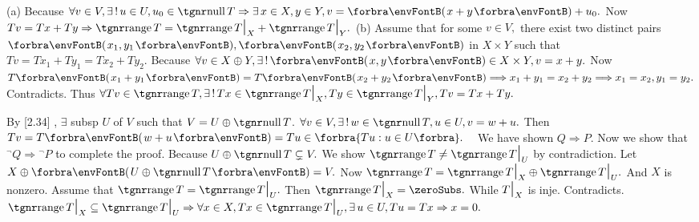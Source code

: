 (a) Because $\forall v\in V,\exists\,!\,u\in U,u_0\in\null T\Rightarrow\exists\,x\in X,y\in Y,v=\Par{x+y}+u_0.$\parSol{\Ha}
Now $Tv=Tx+Ty\Rightarrow\range T=\range T\mmid_X+\range T\mmid_Y.$\parSol{\vspace{2pt}}
(b) Assume that for some $v\in V,$ there exist two distinct pairs $\Par{x_1,y_1},\Par{x_2,y_2}$ in $X\times Y$\parSol{\Hb}
such that $Tv=Tx_1+Ty_1=Tx_2+Ty_2.$ Because $\forall v\in X\oplus Y,\exists\,!\,\Par{x,y}\in X\times Y,v=x+y.$\parSol{\Hb}
Now $T\Par{x_1+y_1}=T\Par{x_2+y_2}\Longrightarrow x_1+y_1=x_2+y_2\Longrightarrow x_1=x_2,y_1=y_2.$ Contradicts.\parSol{\Hb}
Thus $\forall Tv\in\range T,\exists\,!\,Tx\in\range T\mmid_X,Ty\in\range T\mmid_Y,Tv=Tx+Ty.$\PfEnd
\SepLine

By [2.34] , $\exists$ subsp $U$ of $V$ such that $V=U\oplus\null T$.\parSol{}
$\forall v\in V,\exists\,!\,w\in\null T,u\in U, v=w+u.$ Then $Tv=T\Par{w+u}=Tu\in\Bra{Tu:u\in U}.$\PfEnd\vspace{6pt}
\Corollary \,\,\,{\Large\tgsl\envFontLarge[P] \quad [Q]}\vspace{2pt}\parCor
We have shown $Q\Rightarrow P.$ Now we show that ${}^\neg Q\Rightarrow{}^\neg P$ to complete the proof.\parCor
Because $U\oplus\null T\subsetneq V.$ We show $\range T\neq\range T\mmid_U$ by contradiction.\parCor
Let $X\oplus\Par{U\oplus\null T}=V.$ Now $\range T=\range T\mmid_X\oplus\range T\mmid_U.$ And $X$ is nonzero.\parCor
Assume that $\range T=\range T\mmid_U.$ Then $\range T\mmid_X=\zeroSubs.$ While $T\text{\Large|}_X$ is inje. Contradicts.\parCor
\Or $\range T\mmid_X\subseteq\range T\mmid_U\Rightarrow \forall x\in X,Tx\in\range T\mmid_U,\exists\,u\in U,Tu=Tx\Rightarrow x=0.$\PfEnd
\SepLine

